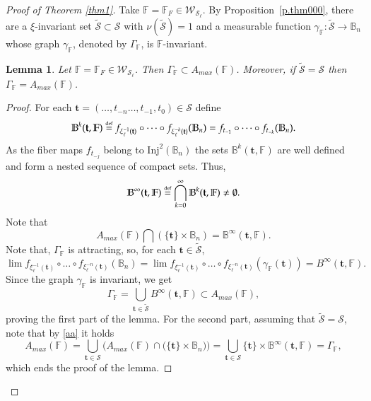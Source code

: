 \documentclass[11pt,reqno]{amsart}
\theoremstyle{plain}
\newtheorem{lemma}[theorem]{Lemma}
\newtheorem*{theorem A}{Theorem A}
\newtheorem*{theorem B}{Theorem B}
\newtheorem*{theorem C}{Theorem C}
\newtheorem*{theorem 1}{Theorem 1}
\newtheorem*{theorem 2}{Theorem 2}
\newtheorem*{theorem 3}{Theorem 3}
\newcommand{\eqdef}{\stackrel{\scriptscriptstyle\rm def}{=}}
\numberwithin{equation}{section}
\begin{document}
\begin{proof}[Proof of Theorem \ref{thm1}]
Take $\mathbb{F}=\mathbb{F}_{F} \in \mathcal{W}_{\mathcal{S}_\ell}$.
By Proposition~\ref{p.thm000}, there are a $\xi$-invariant set $\widetilde{\mathcal{S}}\subset \mathcal{S}$ with $\nu(\widetilde{\mathcal{S}}) = 1$ and a measurable function $\gamma_{\mathbb{F}} : \widetilde{\mathcal{S}}\to \mathbb{B}_n$ whose graph $\gamma_{\mathbb{F}}$, denoted by $\Gamma_{\mathbb{F}}$, is $\mathbb{F}$-invariant.

\begin{lemma}\label{inclusion}
Let $\mathbb{F}=\mathbb{F}_{F} \in \mathcal{W}_{\mathcal{S}_\ell}$.
Then $\Gamma_{\mathbb{F}} \subset A_{max}(\mathbb{F})$. Moreover, if $\widetilde{\mathcal{S}}=\mathcal{S}$ then $\Gamma_{\mathbb{F}}= A_{max}(\mathbb{F})$.
\end{lemma}

\begin{proof}
For each $\textbf{t}=(\ldots, t_{-n}\ldots, t_{-1}, t_0)\in \mathcal{S}$ define
\begin{equation}\label{nested}
 \mathbb{B}^k(\textbf{t},\mathbb{F})\eqdef f_{\xi_\ell^{-1}(\textbf{t})}\circ \dots \circ f_{\xi_\ell^{-k}(\textbf{t})}(\mathbb{B}_n)=f_{t_{-1}}\circ \dots \circ f_{t_{-k}}(\mathbb{B}_n).
\end{equation}
As the fiber maps $f_{t_{-j}}$ belong to $\text{Inj}^2(\mathbb{B}_n)$ the sets $\mathbb{B}^k(\textbf{t},\mathbb{F})$ are well defined and form a nested sequence of compact sets. Thus,
  \begin{equation}\label{nonempty}
  \mathbb{B}^{\infty}(\textbf{t},\mathbb{F})\eqdef \bigcap_{k=0}^\infty \mathbb{B}^k(\textbf{t},\mathbb{F})\neq \emptyset.
  \end{equation}
Note that
\begin{equation}\label{aa}
A_{max}(\mathbb{F}) \bigcap (\{\textbf{t}\} \times \mathbb{B}_{n}) = \mathbb{B}^{\infty}(\textbf{t},\mathbb{F}).
\end{equation}
Note that, $\Gamma_{\mathbb{F}}$ is attracting, so, for each $\textbf{t} \in \widetilde{\mathcal{S}}$,
$$
\lim f_{\xi_\ell^{-1}(\textbf{t})}\circ \dots \circ f_{\xi_\ell^{-n}(\textbf{t})}(\mathbb{B}_n)=\lim f_{\xi_\ell^{-1}(\textbf{t})}\circ \dots \circ f_{\xi_\ell^{-n}(\textbf{t})}( \gamma_\mathbb{F}(\textbf{t}))= B^\infty(\textbf{t} , \mathbb{F}).
$$
Since the graph $\gamma_{\mathbb{F}}$ is invariant, we get
$$
\Gamma_\mathbb{F} = \bigcup_{\textbf{t} \in \widetilde{\mathcal{S}}} B^\infty(\textbf{t} , \mathbb{F}) \subset A_{max}(\mathbb{F}),
$$
proving the first part of the lemma.
For the second part, assuming that $\widetilde{\mathcal{S}}= \mathcal{S}$, note that by \eqref{aa} it holds
$$
A_{max}(\mathbb{F}) = \bigcup_{\textbf{t} \in {\mathcal{S}}} \Big( A_{max}(\mathbb{F}) \cap \big( \{\textbf{t}\} \times \mathbb{B}_n \big) \Big) = \bigcup_{\textbf{t} \in {\mathcal{S}}} \{\textbf{t}\} \times \mathbb{B}^\infty (\textbf{t},\mathbb{F})= \Gamma_\mathbb{F},
$$
which ends the proof of the lemma.
\end{proof}


\end{proof}
\end{document}
